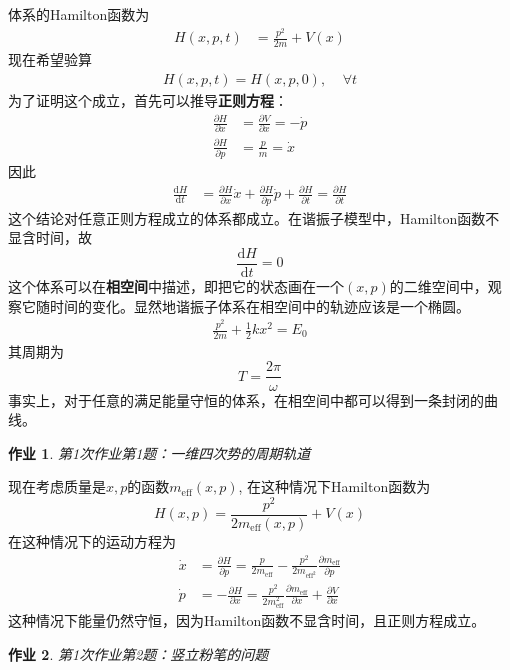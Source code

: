 \documentclass[12pt]{article}
\newtheorem{asg}{作业}
\begin{document}
    体系的Hamilton函数为
    \begin{align*}
        H(x,p,t) &= \frac {p^2}{2m} + V(x)
    \end{align*}
    现在希望验算
    \begin{align*}
        H(x,p,t) = H(x,p,0),~~~~~\forall t
    \end{align*}
    为了证明这个成立，首先可以推导\textbf{正则方程}：
    \begin{align*}
        \frac {\partial H}{\partial x} &= \frac {\partial V}{\partial x} = -\dot{p}\\
        \frac {\partial H}{\partial p} &= \frac pm = \dot{x}
    \end{align*}
    因此
    \begin{align*}
        \frac {\mathrm{d}H}{\mathrm{d}t} &= \frac {\partial H}{\partial x} \dot{x} + \frac {\partial H}{\partial p} \dot{p} + \frac {\partial H}{\partial t} = \frac {\partial H}{\partial t}
    \end{align*}
    这个结论对任意正则方程成立的体系都成立。在谐振子模型中，Hamilton函数不显含时间，故
    \begin{equation*}
        \frac {\mathrm{d}H}{\mathrm{d}t} = 0
    \end{equation*}
    这个体系可以在\textbf{相空间}中描述，即把它的状态画在一个$(x,p)$的二维空间中，观察它随时间的变化。显然地谐振子体系在相空间中的轨迹应该是一个椭圆。
    \begin{align*}
        \frac {p^2}{2m} + \frac 12 kx^2 = E_0
    \end{align*}
    其周期为
    \begin{equation*}
        T = \frac {2\pi}{\omega}
    \end{equation*}
    事实上，对于任意的满足能量守恒的体系，在相空间中都可以得到一条封闭的曲线。
    \begin{asg}
        第1次作业第1题：一维四次势的周期轨道
    \end{asg}

    现在考虑质量是$x,p$的函数$m_\mathrm{eff}(x,p)$, 在这种情况下Hamilton函数为
    \begin{equation*}
        H(x,p) = \frac {p^2}{2m_\mathrm{eff}(x,p)} + V(x)
    \end{equation*}
    在这种情况下的运动方程为
    \begin{align*}
        \dot{x} &= \frac {\partial H}{\partial p} = \frac {p}{2m_{\mathrm{eff}}} - \frac {p^2}{2m_{\mathrm{eff}^2}} \frac {\partial m_\mathrm{eff}}{\partial p} \\
        \dot{p} &= -\frac {\partial H}{\partial x} = \frac {p^2}{2m_\mathrm{eff}^2} \frac {\partial m_\mathrm{eff}}{\partial x} + \frac {\partial V}{\partial x}
    \end{align*}
    这种情况下能量仍然守恒，因为Hamilton函数不显含时间，且正则方程成立。
    \begin{asg}
        第1次作业第2题：竖立粉笔的问题
    \end{asg}
\end{document}
